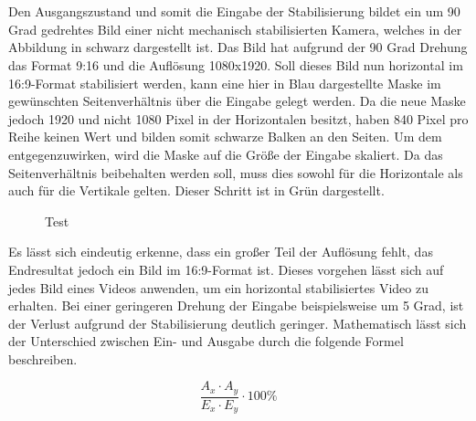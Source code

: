     \\ \\
    Den Ausgangszustand und somit die Eingabe der Stabilisierung bildet ein um 90 Grad gedrehtes Bild einer nicht mechanisch stabilisierten Kamera, welches in der Abbildung in schwarz dargestellt ist. Das Bild hat aufgrund der 90 Grad Drehung das Format 9:16 und die Auflösung 1080x1920. Soll dieses Bild nun horizontal im 16:9-Format stabilisiert werden, kann eine hier in Blau dargestellte Maske im gewünschten Seitenverhältnis über die Eingabe gelegt werden. Da die neue Maske jedoch 1920 und nicht 1080 Pixel in der Horizontalen besitzt, haben 840 Pixel pro Reihe keinen Wert und bilden somit schwarze Balken an den Seiten. Um dem entgegenzuwirken, wird die Maske auf die Größe der Eingabe skaliert. Da das Seitenverhältnis beibehalten werden soll, muss dies sowohl für die Horizontale als auch für die Vertikale gelten. Dieser Schritt ist in Grün dargestellt.

    \begin{figure}[ht]
        \centering
        \def\svgwidth{\linewidth}
        
        \vspace{0.5cm}
        \caption{Test}
        \label{vektorgrafik}
    \end{figure}
    
    Es lässt sich eindeutig erkenne, dass ein großer Teil der Auflösung fehlt, das Endresultat jedoch ein Bild im 16:9-Format ist. Dieses vorgehen lässt sich auf jedes Bild eines Videos anwenden, um ein horizontal stabilisiertes Video zu erhalten. Bei einer geringeren Drehung der Eingabe beispielsweise um 5 Grad, ist der Verlust aufgrund der Stabilisierung deutlich geringer. Mathematisch lässt sich der Unterschied zwischen Ein- und Ausgabe durch die folgende Formel beschreiben.

    \begin{equation}
        \frac{A_x \cdot A_y}{E_x \cdot E_y} \cdot 100\%
    \end{equation}

